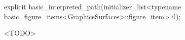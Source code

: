 %
\begin{itemdecl}
explicit basic_interpreted_path(initializer_list<typename
  basic_figure_items<GraphicsSurfaces>::figure_item> il);
\end{itemdecl}
\begin{itemdescr}
\pnum
\effects
<TODO>
\end{itemdescr}

